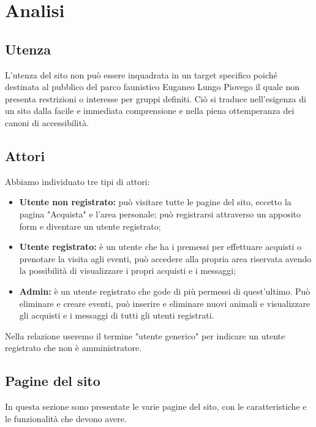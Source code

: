 \section{Analisi}

    \subsection{Utenza}
        L'utenza del sito non può essere inquadrata in un target specifico poiché destinata al pubblico del parco faunistico Euganeo Lungo Piovego il quale non presenta restrizioni o interesse per gruppi definiti. Ciò si traduce nell'esigenza di un sito dalla facile e immediata comprensione e nella piena ottemperanza dei canoni di accessibilità.

    \subsection{Attori}
        Abbiamo individuato tre tipi di attori:
        \begin{itemize}
            \item \textbf{Utente non registrato:} può visitare tutte le pagine del sito, eccetto la pagina "Acquista" e l'area personale; può registrarsi attraverso un apposito form e diventare un utente registrato;
            \item \textbf{Utente registrato:} è un utente che ha i premessi per effettuare acquisti o prenotare la visita agli eventi, può accedere alla propria area riservata avendo la possibilità di visualizzare i propri acquisti e i messaggi;
            \item \textbf{Admin:} è un utente registrato che gode di più permessi di quest'ultimo. Può eliminare e creare eventi, può inserire e eliminare nuovi animali e visualizzare gli acquisti e i messaggi di tutti gli utenti registrati.
        \end{itemize}
        Nella relazione useremo il termine "utente generico" per indicare un utente registrato che non è amministratore.

    \subsection{Pagine del sito}
        In questa sezione sono presentate le varie pagine del sito, con le caratteristiche e le funzionalità che devono avere.
